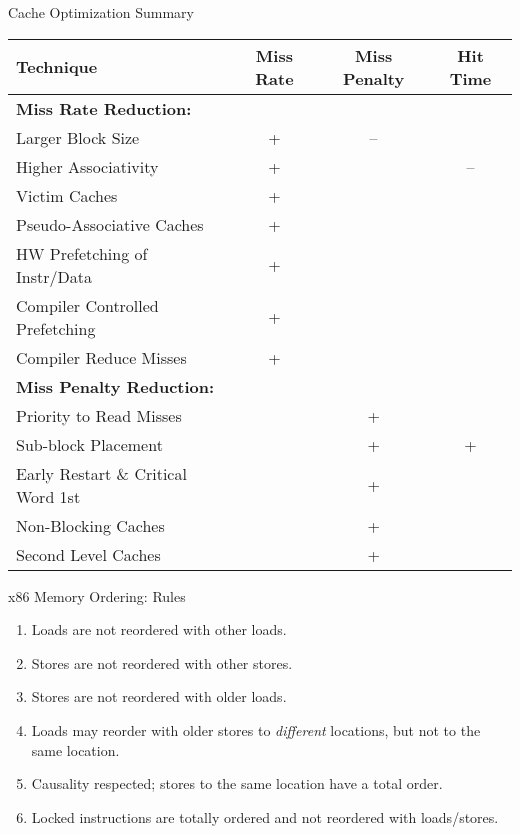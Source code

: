 \documentclass[aspectratio=169,12pt]{beamer}
\begin{document}
\begin{frame}{Cache Optimization Summary}
\begin{center}
\footnotesize
\begin{tabular}{lccc}
\toprule
\textbf{Technique} & \textbf{Miss Rate} & \textbf{Miss Penalty} & \textbf{Hit Time}\\
\midrule
\textbf{Miss Rate Reduction:} & & & \\
\quad Larger Block Size & + & -- & \\
\quad Higher Associativity & + & & -- \\
\quad Victim Caches & + & & \\
\quad Pseudo-Associative Caches & + & & \\
\quad HW Prefetching of Instr/Data & + & & \\
\quad Compiler Controlled Prefetching & + & & \\
\quad Compiler Reduce Misses & + & & \\
\midrule
\textbf{Miss Penalty Reduction:} & & & \\
\quad Priority to Read Misses & & + & \\
\quad Sub-block Placement & & + & + \\
\quad Early Restart \& Critical Word 1st & & + & \\
\quad Non-Blocking Caches & & + & \\
\quad Second Level Caches & & + & \\
\bottomrule
\end{tabular}
\end{center}
\end{frame}

\begin{frame}{x86 Memory Ordering: Rules}
\begin{enumerate}
  \item Loads are not reordered with other loads.
  \item Stores are not reordered with other stores.
  \item Stores are not reordered with older loads.
  \item Loads may reorder with older stores to \emph{different} locations, but not to the same location.
  \item Causality respected; stores to the same location have a total order.
  \item Locked instructions are totally ordered and not reordered with loads/stores.
\end{enumerate}
\end{frame}
\end{document}
